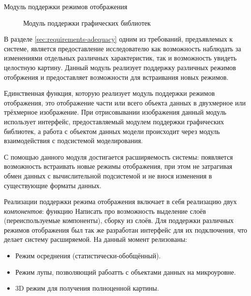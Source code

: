 \documentclass[a4paper,12pt]{extarticle}
\begin{document}
\begin{subsection}{Модуль поддержки режимов отображения}
    \begin{figure}[h]
        \caption{Модуль поддержки графических библиотек}
        \label{ris:architecture-render}
    \end{figure}
    
    В разделе \ref{sec:requirements-adequacy} одним из требований, предъявлемых к системе, является предоставление исследователю как возможность наблюдать за изменениями отдельных различных характеристик, так и возможность увидеть целостную картину. Данный модуль реализует поддержку различных режимов отобржения и предоставляет возможности для встраивания новых режимов.

    Единственная функция, которую реализует модуль поддержки режимов отображения, это отображение части или всего объекта данных в двухмерное или трёхмерное изображение. При отрисовывании изображения данный модуль использует интерфейс, предоставляемый модулем поддержки графических библиотек, а работа с объектом данных модели происходит через модуль взаимодействия с подсистемой моделирования. 

    С помощью данного модуля достигается расширяемость системы: появляется возможность встраивать новые режимы отображения, при этом не затрагивая обмен данных с вычислительной подсистемой и не внося изменения в существующие форматы данных.

    Реализации поддержки режима отображения включает в себя реализацию двух \textit{компонентов}: функцию
    Написать про возможность выделение слоёв (переиспользуемые компоненты), сборку из слоёв.
    Для поддержки различных режимов отображения был так же разработан интерфейс для их подключения, что делает систему расширяемой. На данный момент релизованы:
    \begin{itemize}
        \item Режим осреднения (статистически-обобщённый).
        \item Режим лупы, позволяющий рабоатть с объектами данных на микроуровне.
        \item 3D режим для получения полноценной картины.
    \end{itemize}
\end{subsection}
\end{document}
